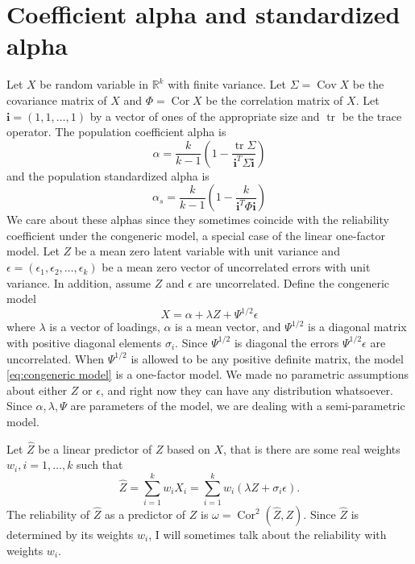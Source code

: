 \documentclass{article}
\theoremstyle{plain}
\theoremstyle{plain}
\theoremstyle{definition}
\theoremstyle{remark}
\theoremstyle{definition}
\theoremstyle{plain}
\theoremstyle{plain}
\theoremstyle{definition}
\DeclareMathOperator{\tr}{tr}
\DeclareMathOperator{\Cor}{Cor}
\DeclareMathOperator{\Cov}{Cov}
\begin{document}
\section{Coefficient alpha and standardized alpha}
\label{sec:coefficienta alpha}

Let $X$ be random variable in $\mathbb{R}^{k}$ with finite variance.
Let $\Sigma=\Cov X$ be the covariance matrix of $X$ and $\Phi=\Cor X$
be the correlation matrix of $X$. Let $\mathbf{i}=\left(1,1,\ldots,1\right)$ by a vector of ones of the appropriate size and $\tr$ be the trace operator.
The population coefficient alpha \citep[][eq. 2]{cronbach1951coefficient} is
\begin{equation}
\alpha =  \frac{k}{k-1}\left(1-\frac{\tr\Sigma}{\mathbf{i}^{T}\Sigma\mathbf{i}}\right)\label{eq:Coefficient alpha}
\end{equation}
and the population standardized alpha \citep[][eq. 2]{Falk2011-ae} is
\begin{equation}
\alpha_s=\frac{k}{k-1}\left(1-\frac{k}{\mathbf{i}^{T}\Phi\mathbf{i}}\right)\label{eq:standardized alpha}
\end{equation}
We care about these alphas since they sometimes coincide with the reliability coefficient under the congeneric model, a special case of the linear one-factor model. Let $Z$ be a mean zero latent variable with unit variance and $\epsilon=\left(\epsilon_{1},\epsilon_{2},\ldots,\epsilon_{k}\right)$
be a mean zero vector of uncorrelated errors with unit variance. In addition, assume $Z$ and $\epsilon$ are uncorrelated. Define the congeneric model
\begin{equation}
X=\alpha + \lambda Z+\Psi^{1/2}\epsilon\label{eq:congeneric model}
\end{equation}
where $\lambda$ is a vector of loadings, $\alpha$ is a mean vector, and $\Psi^{1/2}$ is a diagonal matrix with positive diagonal elements $\sigma_i$. Since $\Psi^{1/2}$ is diagonal the errors $\Psi^{1/2}\epsilon$ are uncorrelated. When $\Psi^{1/2}$ is allowed to be any positive definite matrix, the model \eqref{eq:congeneric model} is a one-factor model. We made no parametric assumptions about either $Z$ or $\epsilon$, and right now they can have any distribution whatsoever. Since $\alpha,\lambda,\Psi$ are parameters of the model, we are dealing with a semi-parametric model.

Let $\hat{Z}$ be a linear predictor of $Z$ based on $X$, that
is there are some real weights $w_{i},i=1,\ldots,k$ such that
\begin{equation}
\label{eq:Linear predictor}
\hat{Z} =  \sum_{i=1}^{k}w_{i}X_i =  \sum_{i=1}^{k}w_{i}\left(\lambda Z+\sigma_{i}\epsilon\right).\nonumber 
\end{equation}
The reliability of $\hat{Z}$ as a predictor of $Z$ is $\omega =\Cor^{2}(\hat{Z},Z)$. Since $\hat{Z}$ is determined by its weights $w_i$, I will sometimes talk about the reliability with weights $w_i$.
\end{document}
